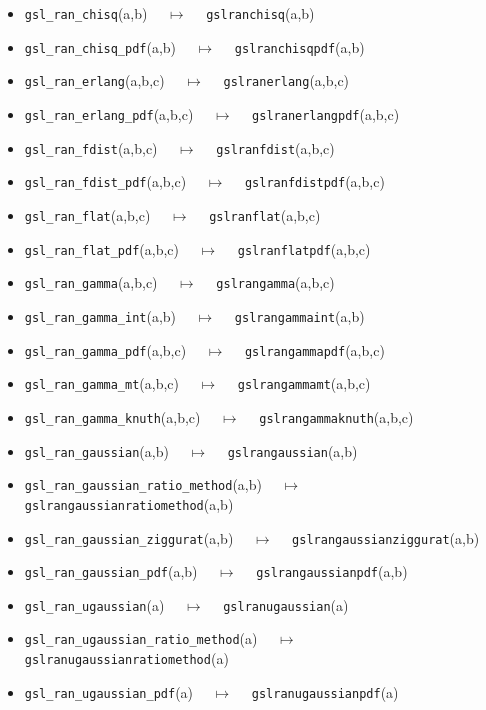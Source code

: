\documentclass[a4paper,twoside,12pt]{book}
\begin{document}
{\begin{itemize}
\item \texttt{gsl\_ran\_chisq}(a,b) $\quad \mapsto\quad $ \texttt{gslranchisq}(a,b) 
\item \texttt{gsl\_ran\_chisq\_pdf}(a,b) $\quad \mapsto\quad $ \texttt{gslranchisqpdf}(a,b) 
\item \texttt{gsl\_ran\_erlang}(a,b,c) $\quad \mapsto\quad $ \texttt{gslranerlang}(a,b,c) 
\item \texttt{gsl\_ran\_erlang\_pdf}(a,b,c) $\quad \mapsto\quad $ \texttt{gslranerlangpdf}(a,b,c) 
\item \texttt{gsl\_ran\_fdist}(a,b,c) $\quad \mapsto\quad $ \texttt{gslranfdist}(a,b,c) 
\item \texttt{gsl\_ran\_fdist\_pdf}(a,b,c) $\quad \mapsto\quad $ \texttt{gslranfdistpdf}(a,b,c) 
\item \texttt{gsl\_ran\_flat}(a,b,c) $\quad \mapsto\quad $ \texttt{gslranflat}(a,b,c) 
\item \texttt{gsl\_ran\_flat\_pdf}(a,b,c) $\quad \mapsto\quad $ \texttt{gslranflatpdf}(a,b,c) 
\item \texttt{gsl\_ran\_gamma}(a,b,c) $\quad \mapsto\quad $ \texttt{gslrangamma}(a,b,c) 
\item \texttt{gsl\_ran\_gamma\_int}(a,b) $\quad \mapsto\quad $ \texttt{gslrangammaint}(a,b) 
\item \texttt{gsl\_ran\_gamma\_pdf}(a,b,c) $\quad \mapsto\quad $ \texttt{gslrangammapdf}(a,b,c) 
\item \texttt{gsl\_ran\_gamma\_mt}(a,b,c) $\quad \mapsto\quad $ \texttt{gslrangammamt}(a,b,c) 
\item \texttt{gsl\_ran\_gamma\_knuth}(a,b,c) $\quad \mapsto\quad $ \texttt{gslrangammaknuth}(a,b,c) 
\item \texttt{gsl\_ran\_gaussian}(a,b) $\quad \mapsto\quad $ \texttt{gslrangaussian}(a,b) 
\item \texttt{gsl\_ran\_gaussian\_ratio\_method}(a,b) $\quad \mapsto\quad $ \texttt{gslrangaussianratiomethod}(a,b) 
\item \texttt{gsl\_ran\_gaussian\_ziggurat}(a,b) $\quad \mapsto\quad $ \texttt{gslrangaussianziggurat}(a,b) 
\item \texttt{gsl\_ran\_gaussian\_pdf}(a,b) $\quad \mapsto\quad $ \texttt{gslrangaussianpdf}(a,b) 
\item \texttt{gsl\_ran\_ugaussian}(a) $\quad \mapsto\quad $ \texttt{gslranugaussian}(a) 
\item \texttt{gsl\_ran\_ugaussian\_ratio\_method}(a) $\quad \mapsto\quad $ \texttt{gslranugaussianratiomethod}(a) 
\item \texttt{gsl\_ran\_ugaussian\_pdf}(a) $\quad \mapsto\quad $ \texttt{gslranugaussianpdf}(a) 

\end{itemize}}
\end{document}

